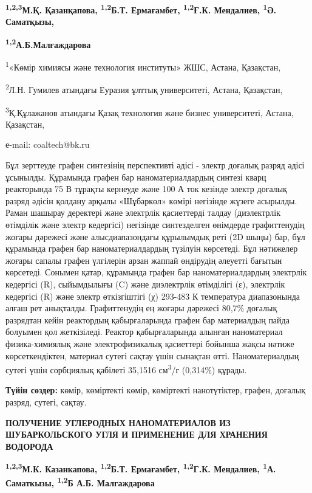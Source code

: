 {\bfseries \textsuperscript{1,2,3}М.Қ. Қазанқапова,
\textsuperscript{1,2}Б.Т. Ермағамбет, \textsuperscript{1,2}Ғ.К.
Мендалиев, \textsuperscript{1}Ә. Саматқызы,}

{\bfseries \textsuperscript{1,2}А.Б.Малғаждарова}

\textsuperscript{1}«Көмір химиясы және технология институты» ЖШС,
Астана, Қазақстан,

\textsuperscript{2}Л.Н. Гумилев атындағы Еуразия ұлттық университеті,
Астана, Қазақстан,

\textsuperscript{3}Қ.Құлажанов атындағы Қазақ технология және бизнес
университеті, Астана, Қазақстан,

е-mail: coaltech@bk.ru

Бұл зерттеуде графен синтезінің перспективті әдісі - электр доғалық
разряд әдісі ұсынылды. Құрамында графен бар наноматериалдардың синтезі
кварц реакторында 75 В тұрақты кернеуде және 100 А ток кезінде электр
доғалық разряд әдісін қолдану арқылы «Шұбаркөл» көмірі негізінде жүзеге
асырылды. Раман шашырау деректері және электрлік қасиеттерді талдау
(диэлектрлік өтімділік және электр кедергісі) негізінде синтезделген
өнімдерде графиттенудің жоғары дәрежесі және алысдиапазондағы құрылымдық
реті (2D шыңы) бар, бұл құрамында графен бар наноматериалдардың түзілуін
көрсетеді. Бұл нәтижелер жоғары сапалы графен үлгілерін арзан жаппай
өндірудің әлеуетті бағытын көрсетеді. Сонымен қатар, құрамында графен
бар наноматериалдардың электрлік кедергісі (R), сыйымдылығы (C) және
диэлектрлік өтімділігі (ε), электрлік кедергісі (R) және электр
өткізгіштігі (χ) 293-483 К температура диапазонында алғаш рет анықталды.
Графиттенудің ең жоғары дәрежесі 80,7\% доғалық разрядтан кейін
реактордың қабырғаларында графен бар материалдың пайда болуымен қол
жеткізіледі. Реактор қабырғаларында алынған наноматериал физика-химиялық
және электрофизикалық қасиеттері бойынша жақсы нәтиже көрсеткендіктен,
материал сутегі сақтау үшін сынақтан өтті. Наноматериалдың сутегі үшін
сорбциялық қабілеті 35,1516 см\textsuperscript{3}/г (0,314\%) құрады.

{\bfseries Түйін сөздер:} көмір, көміртекті көмір, көміртекті нанотүтіктер,
графен, доғалық разряд, сутегі, сақтау.

{\bfseries ПОЛУЧЕНИЕ УГЛЕРОДНЫХ НАНОМАТЕРИАЛОВ ИЗ ШУБАРКОЛЬСКОГО УГЛЯ И
ПРИМЕНЕНИЕ ДЛЯ ХРАНЕНИЯ ВОДОРОДА}

{\bfseries \textsuperscript{1,2,3}М.К. Казанкапова,
\textsuperscript{1,2}Б.Т. Ермағамбет, \textsuperscript{1,2}Г.К.
Мендалиев, \textsuperscript{1}А. Саматкызы, \textsuperscript{1,2}Б А.Б.
Малгаждарова}

